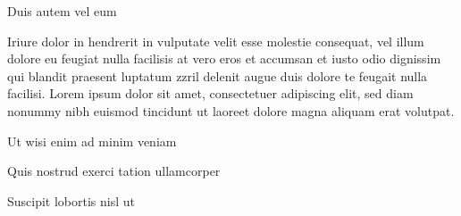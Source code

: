 \documentclass[11pt,twoside]{article}\makeatletter
\begin{document}
Duis autem vel eum \par
Iriure dolor in hendrerit in vulputate velit esse molestie       consequat, vel illum dolore eu feugiat nulla facilisis at vero eros et       accumsan et iusto odio dignissim qui blandit praesent luptatum zzril       delenit augue duis dolore te feugait nulla facilisi. Lorem ipsum dolor       sit amet, consectetuer adipiscing elit, sed diam nonummy nibh euismod       tincidunt ut laoreet dolore magna aliquam erat volutpat. \par
Ut wisi enim ad minim veniam\par
Quis nostrud exerci tation ullamcorper \par
Suscipit lobortis nisl ut  
\end{document}
